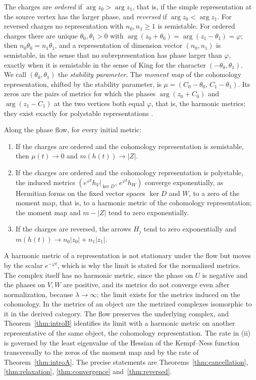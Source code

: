 The charges are \emph{ordered} if $\arg z_0>\arg z_1$, that is, if the simple
representation at the source vertex has the larger phase, and
\emph{reversed} if $\arg z_0<\arg z_1$. For reversed charges no
representation with $n_0,n_1\geq1$ is semistable. For ordered charges there
are unique $\theta_0,\theta_1>0$ with
$\arg(z_0+\theta_0)=\arg(z_1-\theta_1)=\varphi$; then
$n_0\theta_0=n_1\theta_1$, and a representation of dimension vector
$(n_0,n_1)$ is semistable, in the sense that no subrepresentation has phase
larger than $\varphi$, exactly when it is semistable in the sense of King
\cite{kin94} for the character $(-\theta_0,\theta_1)$. We call
$(\theta_0,\theta_1)$ the \emph{stability parameter}. The \emph{moment map} of
the cohomology representation, shifted by the stability parameter, is
$\mu=(C_0-\theta_0,\,C_1-\theta_1)$. Its zeros are the pairs of metrics for
which the phases $\arg(z_0+C_0)$ and $\arg(z_1-C_1)$ at the two vertices both
equal $\varphi$, that is, the harmonic metrics; they exist exactly for polystable
representations \cite{kn79,kin94}.

\begin{theorem}[Convergence]\label{thm:introB}
Along the phase flow, for every initial metric:
\begin{enumerate}
\item[(i)] If the charges are ordered and the cohomology representation is
 semistable, then $\mu(t)\to0$ and $m(h(t))\to|Z|$.
\item[(ii)] If the charges are ordered and the cohomology representation is
 polystable, the induced metrics
 $(e^{\varphi t}h_V|_{\ker D},\,e^{\varphi t}h_W)$ converge exponentially, as
 Hermitian forms on the fixed vector spaces $\ker D$ and $W$, to a zero of
 the moment map, that is, to a harmonic metric of the cohomology
 representation; the moment map and $m-|Z|$ tend to zero exponentially.
\item[(iii)] If the charges are reversed, the arrows $H_j$ tend to zero
 exponentially and $m(h(t))\to n_0|z_0|+n_1|z_1|$.
\end{enumerate}
\end{theorem}

A harmonic metric of a representation is not stationary under the flow but
moves by the scalar $e^{-\varphi t}$, which is why the limit is stated for
the normalized metrics. The complex itself has no harmonic metric, since the
phase on $U$ is negative and the phases on $V,W$ are positive, and its
metrics do not converge even after normalization, because $\lambda\to\infty$;
the limit exists for the metrics induced on the cohomology. In
\cite[Remark~5.15]{hkkp26} the metrics of an object are the metrized
complexes isomorphic to it in the derived category. The flow preserves the
underlying complex, and Theorem~\ref{thm:introB} identifies its limit with a
harmonic metric on another representative of the same object, the
cohomology representation. The rate in (ii)
is governed by the least eigenvalue of the Hessian of the Kempf--Ness
function transversally to the zeros of the moment map and by the rate of
Theorem~\ref{thm:introA}. The precise statements are
Theorems~\ref{thm:cancellation}, \ref{thm:relaxation}, \ref{thm:convergence}
and~\ref{thm:reversed}.

